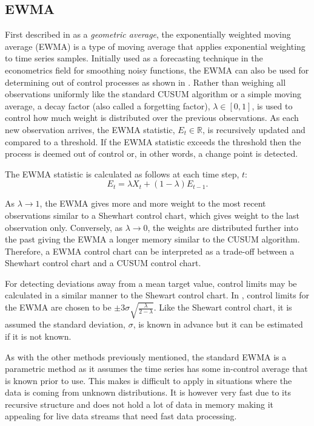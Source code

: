 \subsection{EWMA}
First described in \cite{roberts1959control} as a \textit{geometric average}, the exponentially weighted moving average (EWMA) is a type of moving average that applies exponential weighting to time series samples. Initially used as a forecasting technique in the econometrics field for smoothing noisy functions, the EWMA can also be used for determining out of control processes as shown in \cite{hunter1986exponentially}. Rather than weighing all observations uniformly like the standard CUSUM algorithm or a simple moving average, a decay factor (also called a  forgetting factor), $\lambda \in [0,1]$, is used to control how much weight is distributed over the previous observations. As each new observation arrives, the EWMA statistic, $E_t \in \mathbb{R}$, is recursively updated and compared to a threshold. If the EWMA statistic exceeds the threshold then the process is deemed out of control or, in other words, a change point is detected.

The EWMA statistic is calculated as follows at each time step, $t$:
$$E_t = \lambda X_t + (1-\lambda)E_{t-1}. $$

As $\lambda \to 1$, the EWMA gives more and more weight to the most recent observations similar to a Shewhart control chart, which gives weight to the last observation only. Conversely, as $\lambda \to 0$, the weights are distributed further into the past giving the EWMA a longer memory similar to the CUSUM algorithm. Therefore, a EWMA control chart can be interpreted as a trade-off between a Shewhart control chart and a CUSUM control chart. 

For detecting deviations away from a mean target value, control limits may be calculated in a similar manner to the Shewart control chart. In \cite{hunter1986exponentially}, control limits for the EWMA are chosen to be  $\pm 3 \sigma \sqrt{\frac{\lambda}{2-\lambda}}$.  Like the Shewart control chart, it is assumed the standard deviation, $\sigma$, is known in advance but it can be estimated if it is not known. %


As with the other methods previously mentioned, the standard EWMA is a parametric method as it assumes the time series has some in-control average that is known prior to use. This makes is difficult to apply in situations where the data is coming from unknown distributions. It is however very fast due to its recursive structure and does not hold a lot of data in memory making it appealing for live data streams that need fast data processing.